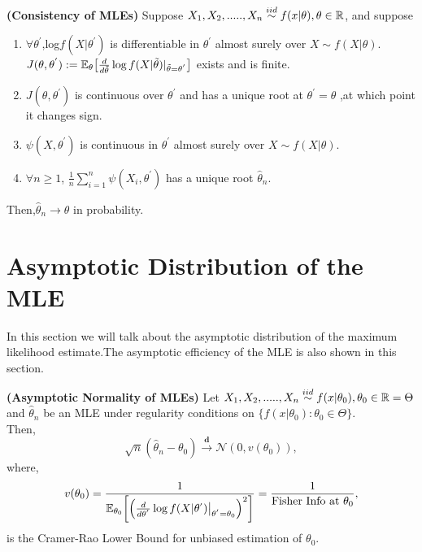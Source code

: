 \documentclass[a4paper,english,12pt]{article}
\begin{document}
\begin{thm}\textbf{(Consistency of MLEs)}
 Suppose $X_1,X_2,.....,X_n \overset{iid}{\sim } f(x|\theta), \theta \in  \mathbb{R}$, and suppose
\begin{enumerate}
\item $\forall \theta^{'}$,log$f(X|\theta^{'})$ is differentiable in $\theta^{'}$ almost surely over $X \sim f(X|\theta)$.\\
$J(\theta,\theta^{'}) := \mathbb{E}_\theta\big[\frac{d}{d\tilde{\theta}}\log f(X|\tilde{\theta})|_{\tilde{\theta}=\theta^{'} }\big]$ exists and is finite.
\item  $J(\theta,\theta^{'})$ is continuous over $\theta^{'}$ and has a unique root at $\theta^{'}=\theta$ ,at which point it changes sign. 
\item  $ \psi(X,\theta^{'})$ is continuous in $\theta^{'}$ almost surely over $X \sim f(X|\theta)$.
\item $\forall n \geq 1$,  $\frac{1}{n}\sum_{i=1}^{n}\psi(X_i,\theta^{'})$ has a unique root $\hat{\theta}_n$.  
\end{enumerate}
Then,$\hat{\theta}_n \rightarrow \theta$ in probability.
\end{thm}
\section{Asymptotic Distribution of the MLE}
\par In this section we will talk about the asymptotic distribution of the maximum likelihood estimate.The asymptotic efficiency of the MLE is also shown in this section. 
\begin{thm}\textbf{(Asymptotic Normality of MLEs)}
Let $X_1,X_2,.....,X_n \overset{iid}{\sim } f(x|\theta_0), \theta_0 \in  \mathbb{R}= \Theta$ and $\hat{\theta}_n$ be an MLE under regularity conditions on $ \{ f(x|\theta_0): \theta_0 \in \Theta \}$.\\
Then,
\begin{equation}
\sqrt{n}(\hat{\theta}_n-\theta_0)\xrightarrow{\textbf{d}}\mathcal{N}(0,v(\theta_0)),
\end{equation} 
where, 
\begin{equation}
 v(\theta_0) = \frac{1}{\mathbb{E}_{\theta_0}\bigg [\Big(\frac{d}{d\theta^{'}}\log f(X|\theta^{'})\big|_{\theta^{'}=\theta_0}\Big)^{2}\bigg]}=\frac{1}{\text{Fisher Info at } \theta_0},
 \end{equation}
  is the Cramer-Rao Lower Bound for unbiased estimation  of $\theta_0$.
\end{thm} 
\end{document}
